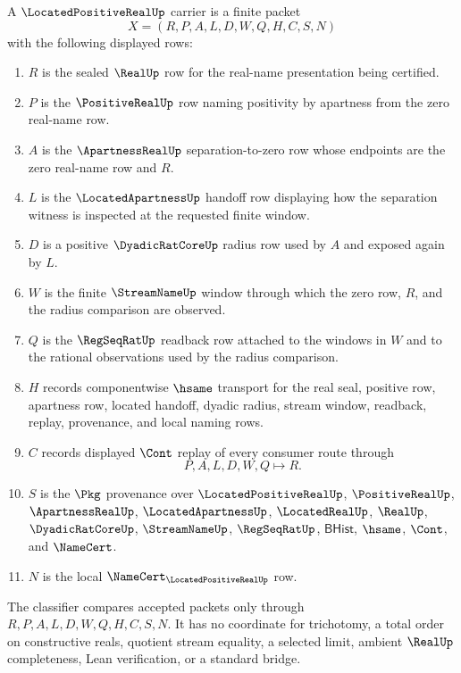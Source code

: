 \begin{definition}
\label{def:located-positive-real-carrier}
A $\LocatedPositiveRealUp$ carrier is a finite packet
$$
X=(R,P,A,L,D,W,Q,H,C,S,N)
$$
with the following displayed rows:
\begin{enumerate}
\item $R$ is the sealed $\RealUp$ row for the real-name presentation being certified.
\item $P$ is the $\PositiveRealUp$ row naming positivity by apartness from the zero real-name row.
\item $A$ is the $\ApartnessRealUp$ separation-to-zero row whose endpoints are the zero real-name row and $R$.
\item $L$ is the $\LocatedApartnessUp$ handoff row displaying how the separation witness is inspected at the requested finite window.
\item $D$ is a positive $\DyadicRatCoreUp$ radius row used by $A$ and exposed again by $L$.
\item $W$ is the finite $\StreamNameUp$ window through which the zero row, $R$, and the radius comparison are observed.
\item $Q$ is the $\RegSeqRatUp$ readback row attached to the windows in $W$ and to the rational observations used by the radius comparison.
\item $H$ records componentwise $\hsame$ transport for the real seal, positive row, apartness row, located handoff, dyadic radius, stream window, readback, replay, provenance, and local naming rows.
\item $C$ records displayed $\Cont$ replay of every consumer route through
$$
P,A,L,D,W,Q \longmapsto R .
$$
\item $S$ is the $\Pkg$ provenance over $\LocatedPositiveRealUp$, $\PositiveRealUp$, $\ApartnessRealUp$, $\LocatedApartnessUp$, $\LocatedRealUp$, $\RealUp$, $\DyadicRatCoreUp$, $\StreamNameUp$, $\RegSeqRatUp$, $\mathsf{BHist}$, $\hsame$, $\Cont$, and $\NameCert$.
\item $N$ is the local $\NameCert_{\LocatedPositiveRealUp}$ row.
\end{enumerate}
The classifier compares accepted packets only through $R,P,A,L,D,W,Q,H,C,S,N$. It has no coordinate for trichotomy, a total order on constructive reals, quotient stream equality, a selected limit, ambient $\RealUp$ completeness, Lean verification, or a standard bridge.
\end{definition}

